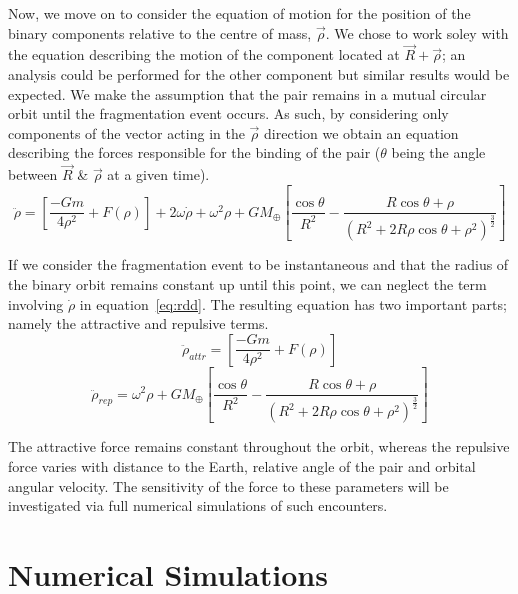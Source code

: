 \documentclass[letterpaper, preprint, paper,11pt]{AAS}	%
\begin{document}
Now, we move on to consider the equation of motion for the position of the binary components relative to the centre of mass, $\vec{\rho}$. We chose to work soley with the equation describing the motion of the component located at $\vec{R}+\vec{\rho}$; an analysis could be performed for the other component but similar results would be expected. We make the assumption that the pair remains in a mutual circular orbit until the fragmentation event occurs. As such, by considering only components of the vector acting in the $\vec{\rho}$ direction we obtain an equation describing the forces responsible for the binding of the pair ($\theta$ being the angle between $\vec{R}$ \& $\vec{\rho}$ at a given time).
\begin{equation}\label{eq:rdd}
\ddot{\rho} = \left[\frac{-Gm}{4\rho^{2}}+F(\rho)\right]+2\omega\dot{\rho}+\omega^{2}\rho+{GM_\oplus}\left[\frac{\cos\theta}{R^{2}}-\frac{R\cos\theta+\rho}{(R^{2}+2R\rho\cos\theta+\rho^{2})^\frac{3}{2}}\right]
\end{equation}

If we consider the fragmentation event to be instantaneous and that the radius of the binary orbit remains constant up until this point, we can neglect the term involving $\dot{\rho}$ in equation~\ref{eq:rdd}. The resulting equation has two important parts; namely the attractive and repulsive terms.
\begin{equation} \label{eq:attr}
\ddot{\rho}_{attr} = \left[\frac{-Gm}{4\rho^{2}}+F(\rho)\right]
\end{equation}
\begin{equation} \label{eq:rep}
\ddot{\rho}_{rep} = \omega^{2}\rho+{GM_\oplus}\left[\frac{\cos\theta}{R^{2}}-\frac{R\cos\theta+\rho}{(R^{2}+2R\rho\cos\theta+\rho^{2})^\frac{3}{2}}\right]
\end{equation}

The attractive force remains constant throughout the orbit, whereas the repulsive force varies with distance to the Earth, relative angle of the pair and orbital angular velocity. The sensitivity of the force to these parameters will be investigated via full numerical simulations of such encounters. 


\section{Numerical Simulations}
\end{document}
